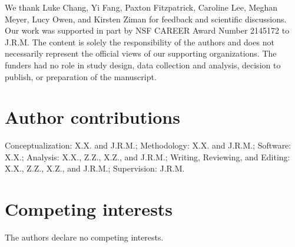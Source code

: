 \documentclass[10pt]{article}
\begin{document}
We thank Luke Chang, Yi Fang, Paxton Fitzpatrick, Caroline Lee, Meghan Meyer, Lucy Owen, and Kirsten Ziman for feedback and scientific discussions. Our work was supported in part by NSF CAREER Award Number 2145172 to J.R.M. The content is solely the responsibility of the authors and does not necessarily represent the official views of our supporting organizations. The funders had no role in study design, data collection and analysis, decision to publish, or preparation of the manuscript.

\section*{Author contributions}

Conceptualization: X.X. and J.R.M.; Methodology: X.X. and J.R.M.; Software: X.X.; Analysis: X.X., Z.Z., X.Z., and J.R.M.; Writing, Reviewing, and Editing: X.X., Z.Z., X.Z., and J.R.M.; Supervision: J.R.M.

\section*{Competing interests}

The authors declare no competing interests.
\end{document}
